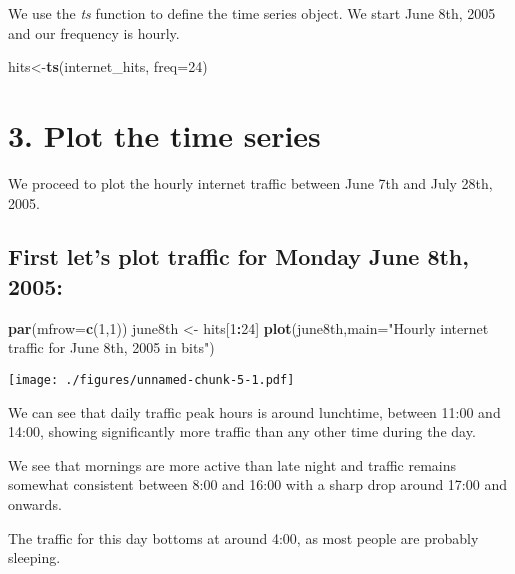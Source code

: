 \documentclass[]{article}
\newenvironment{Shaded}{\begin{snugshade}}{\end{snugshade}}
\newcommand{\DataTypeTok}[1]{\textcolor[rgb]{0.13,0.29,0.53}{#1}}
\newcommand{\DecValTok}[1]{\textcolor[rgb]{0.00,0.00,0.81}{#1}}
\newcommand{\KeywordTok}[1]{\textcolor[rgb]{0.13,0.29,0.53}{\textbf{#1}}}
\newcommand{\NormalTok}[1]{#1}
\newcommand{\OperatorTok}[1]{\textcolor[rgb]{0.81,0.36,0.00}{\textbf{#1}}}
\newcommand{\StringTok}[1]{\textcolor[rgb]{0.31,0.60,0.02}{#1}}
\begin{document}
We use the \emph{ts} function to define the time series object. We start
June 8th, 2005 and our frequency is hourly.

\begin{Shaded}
\begin{Highlighting}[]
\NormalTok{hits<-}\KeywordTok{ts}\NormalTok{(internet_hits, }\DataTypeTok{freq=}\DecValTok{24}\NormalTok{)}
\end{Highlighting}
\end{Shaded}

\newpage

\hypertarget{plot-the-time-series}{%
\section{3. Plot the time series}\label{plot-the-time-series}}

We proceed to plot the hourly internet traffic between June 7th and July
28th, 2005.

\hypertarget{first-lets-plot-traffic-for-monday-june-8th-2005}{%
\subsection{First let's plot traffic for Monday June 8th,
2005:}\label{first-lets-plot-traffic-for-monday-june-8th-2005}}

\begin{Shaded}
\begin{Highlighting}[]
\KeywordTok{par}\NormalTok{(}\DataTypeTok{mfrow=}\KeywordTok{c}\NormalTok{(}\DecValTok{1}\NormalTok{,}\DecValTok{1}\NormalTok{))}
\NormalTok{june8th <-}\StringTok{ }\NormalTok{hits[}\DecValTok{1}\OperatorTok{:}\DecValTok{24}\NormalTok{]}
\KeywordTok{plot}\NormalTok{(june8th,}\DataTypeTok{main=}\StringTok{"Hourly internet traffic for June 8th, 2005 in bits"}\NormalTok{)}
\end{Highlighting}
\end{Shaded}

\texttt{[image: ./figures/unnamed-chunk-5-1.pdf]}

We can see that daily traffic peak hours is around lunchtime, between
11:00 and 14:00, showing significantly more traffic than any other time
during the day.

We see that mornings are more active than late night and traffic remains
somewhat consistent between 8:00 and 16:00 with a sharp drop around
17:00 and onwards.

The traffic for this day bottoms at around 4:00, as most people are
probably sleeping.
\end{document}
